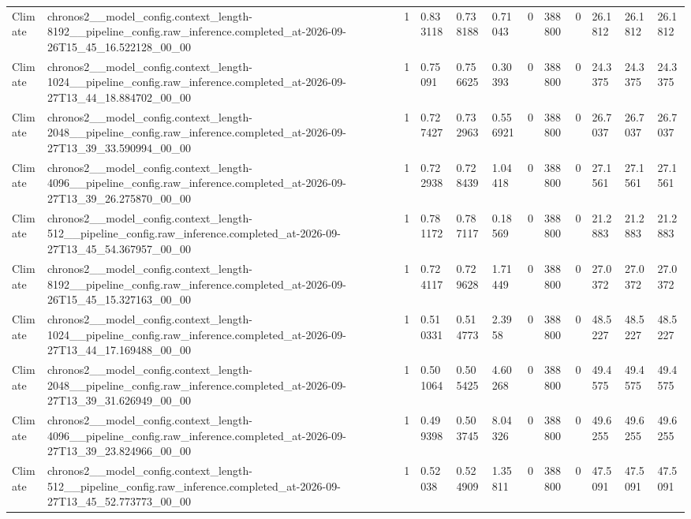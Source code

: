 \begin{tabular}{llllllllllll}
Climate & chronos2\_\_model\_config.context\_length-8192\_\_pipeline\_config.raw\_inference.completed\_at-2026-09-26T15\_45\_16.522128\_00\_00 & 1 & 0.833118 & 0.738188 & 0.71043 & 0 & 388800 & 0 & 26.1812 & 26.1812 & 26.1812 \\
Climate & chronos2\_\_model\_config.context\_length-1024\_\_pipeline\_config.raw\_inference.completed\_at-2026-09-27T13\_44\_18.884702\_00\_00 & 1 & 0.75091 & 0.756625 & 0.30393 & 0 & 388800 & 0 & 24.3375 & 24.3375 & 24.3375 \\
Climate & chronos2\_\_model\_config.context\_length-2048\_\_pipeline\_config.raw\_inference.completed\_at-2026-09-27T13\_39\_33.590994\_00\_00 & 1 & 0.727427 & 0.732963 & 0.556921 & 0 & 388800 & 0 & 26.7037 & 26.7037 & 26.7037 \\
Climate & chronos2\_\_model\_config.context\_length-4096\_\_pipeline\_config.raw\_inference.completed\_at-2026-09-27T13\_39\_26.275870\_00\_00 & 1 & 0.722938 & 0.728439 & 1.04418 & 0 & 388800 & 0 & 27.1561 & 27.1561 & 27.1561 \\
Climate & chronos2\_\_model\_config.context\_length-512\_\_pipeline\_config.raw\_inference.completed\_at-2026-09-27T13\_45\_54.367957\_00\_00 & 1 & 0.781172 & 0.787117 & 0.18569 & 0 & 388800 & 0 & 21.2883 & 21.2883 & 21.2883 \\
Climate & chronos2\_\_model\_config.context\_length-8192\_\_pipeline\_config.raw\_inference.completed\_at-2026-09-26T15\_45\_15.327163\_00\_00 & 1 & 0.724117 & 0.729628 & 1.71449 & 0 & 388800 & 0 & 27.0372 & 27.0372 & 27.0372 \\
Climate & chronos2\_\_model\_config.context\_length-1024\_\_pipeline\_config.raw\_inference.completed\_at-2026-09-27T13\_44\_17.169488\_00\_00 & 1 & 0.510331 & 0.514773 & 2.3958 & 0 & 388800 & 0 & 48.5227 & 48.5227 & 48.5227 \\
Climate & chronos2\_\_model\_config.context\_length-2048\_\_pipeline\_config.raw\_inference.completed\_at-2026-09-27T13\_39\_31.626949\_00\_00 & 1 & 0.501064 & 0.505425 & 4.60268 & 0 & 388800 & 0 & 49.4575 & 49.4575 & 49.4575 \\
Climate & chronos2\_\_model\_config.context\_length-4096\_\_pipeline\_config.raw\_inference.completed\_at-2026-09-27T13\_39\_23.824966\_00\_00 & 1 & 0.499398 & 0.503745 & 8.04326 & 0 & 388800 & 0 & 49.6255 & 49.6255 & 49.6255 \\
Climate & chronos2\_\_model\_config.context\_length-512\_\_pipeline\_config.raw\_inference.completed\_at-2026-09-27T13\_45\_52.773773\_00\_00 & 1 & 0.52038 & 0.524909 & 1.35811 & 0 & 388800 & 0 & 47.5091 & 47.5091 & 47.5091 \\

\end{tabular}

